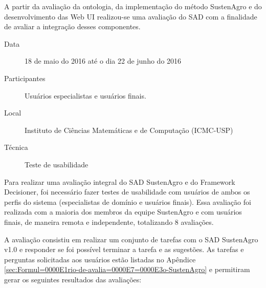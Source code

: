 A partir da avaliação da ontologia, da implementação do método SustenAgro
e do desenvolvimento das Web UI realizou-se uma avaliação do SAD com
a finalidade de avaliar a integração desses componentes.
\begin{description}
\item [{Data}] 18 de maio do 2016 até o dia 22 de junho do 2016
\item [{Participantes}] Usuários especialistas e usuários finais.
\item [{Local}] Instituto de Ciências Matemáticas e de Computação (ICMC-USP)
\item [{Técnica}] Teste de usabilidade
\end{description}
Para realizar uma avaliação integral do SAD SustenAgro e do Framework
Decisioner, foi necessário fazer testes de usabilidade com usuários
de ambos os perfis do sistema (especialistas de domínio e usuários
finais). Essa avaliação foi realizada com a maioria dos membros da
equipe SustenAgro e com usuários finais, de maneira remota e independente,
totalizando 8 avaliações.

A avaliação consistiu em realizar um conjunto de tarefas com o SAD
SustenAgro v1.0 e responder se foi possível terminar a tarefa e as
sugestões. As tarefas e perguntas solicitadas aos usuários estão listadas
no Apêndice \ref{sec:Formul=0000E1rio-de-avalia=0000E7=0000E3o-SustenAgro}
e permitiram gerar os seguintes resultados das avaliações:


